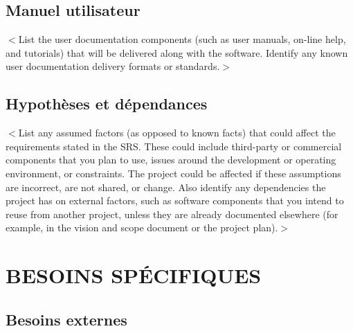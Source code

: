 \documentclass{scrreprt}
\begin{document}
\section{Manuel utilisateur}
$<$List the user documentation components (such as user manuals, on-line help, 
and tutorials) that will be delivered along with the software. Identify any 
known user documentation delivery formats or standards.$>$


\section{Hypothèses et dépendances}
$<$List any assumed factors (as opposed to known facts) that could affect the 
requirements stated in the SRS. These could include third-party or commercial 
components that you plan to use, issues around the development or operating 
environment, or constraints. The project could be affected if these assumptions 
are incorrect, are not shared, or change. Also identify any dependencies the 
project has on external factors, such as software components that you intend to 
reuse from another project, unless they are already documented elsewhere (for 
example, in the vision and scope document or the project plan).$>$


\chapter{BESOINS SPÉCIFIQUES}

\section{Besoins externes}
\end{document}
